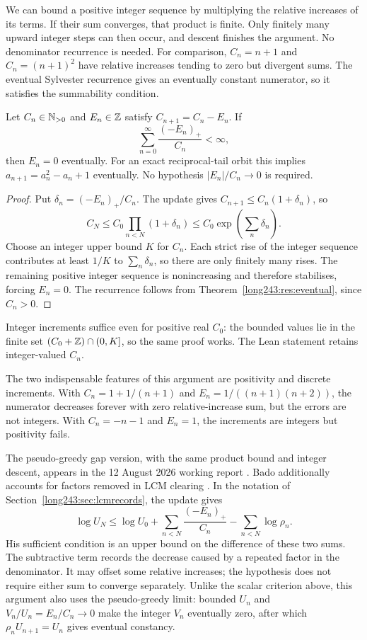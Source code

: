 \documentclass[11pt]{article}
\begin{document}
We can bound a positive integer sequence by multiplying the relative
increases of its terms. If their sum converges, that product is finite.
Only finitely many upward integer steps can then occur, and descent
finishes the argument. No denominator recurrence is needed.
For comparison, $C_n=n+1$ and $C_n=(n+1)^2$ have relative increases
tending to zero but divergent sums. The eventual Sylvester recurrence gives an eventually
constant numerator, so it satisfies the summability condition.

\begin{samepage}
\begin{theorem}\label{long243:res:mass}
Let \(C_n\in\mathbb{N}_{>0}\) and \(E_n\in\mathbb{Z}\) satisfy \(C_{n+1}=C_n-E_n\).
If
\[
 \sum_{n=0}^{\infty}\frac{(-E_n)_+}{C_n}<\infty,
\]
then \(E_n=0\) eventually. For an exact reciprocal-tail orbit this implies
\(a_{n+1}=a_n^2-a_n+1\) eventually. No hypothesis $|E_n|/C_n\to0$ is required.
\end{theorem}
\end{samepage}

\begin{proof}
Put \(\delta_n=(-E_n)_+/C_n\). The update gives
\(C_{n+1}\le C_n(1+\delta_n)\), so
\[
 C_N\le C_0\prod_{n<N}(1+\delta_n)
 \le C_0\exp\!\left(\sum_n\delta_n\right).
\]
Choose an integer upper bound \(K\) for \(C_n\). Each strict rise of the
integer sequence contributes at least \(1/K\) to \(\sum_n\delta_n\), so
there are only finitely many rises. The remaining positive integer sequence
is nonincreasing and therefore stabilises, forcing \(E_n=0\). The recurrence
follows from Theorem~\ref{long243:res:eventual}, since \(C_n>0\).
\end{proof}

Integer increments suffice even for positive real $C_0$: the bounded
values lie in the finite set $(C_0+\mathbb{Z})\cap(0,K]$, so the same proof
works. The Lean statement retains integer-valued $C_n$.

The two indispensable features of this argument are positivity and
discrete increments. With $C_n=1+1/(n+1)$ and
$E_n=1/((n+1)(n+2))$, the numerator decreases forever with zero
relative-increase sum, but the errors are not integers. With $C_n=-n-1$
and $E_n=1$, the increments are integers but positivity fails.

The pseudo-greedy gap version, with the same product bound and integer
descent, appears in the 12 August 2026 working report
\cite[``A global termination criterion'']{erdosproblemaday243}.
Bado additionally accounts for factors removed in LCM clearing
\cite[Thm.~11.1 and Remark~11.3, p.~9]{bado2026}. In the notation of
Section~\ref{long243:sec:lcmrecords}, the update gives
\[
 \log U_N\le\log U_0+
 \sum_{n<N}\frac{(-E_n)_+}{C_n}-\sum_{n<N}\log\rho_n.
\]
His sufficient condition is an upper bound on the difference of these
two sums. The subtractive term records the decrease caused by a repeated
factor in the denominator. It may offset some relative increases; the
hypothesis does not require either sum to converge separately. Unlike the
scalar criterion above, this argument also uses the pseudo-greedy limit:
bounded $U_n$ and $V_n/U_n=E_n/C_n\to0$ make the integer $V_n$ eventually
zero, after which $\rho_nU_{n+1}=U_n$ gives eventual constancy.
\end{document}
